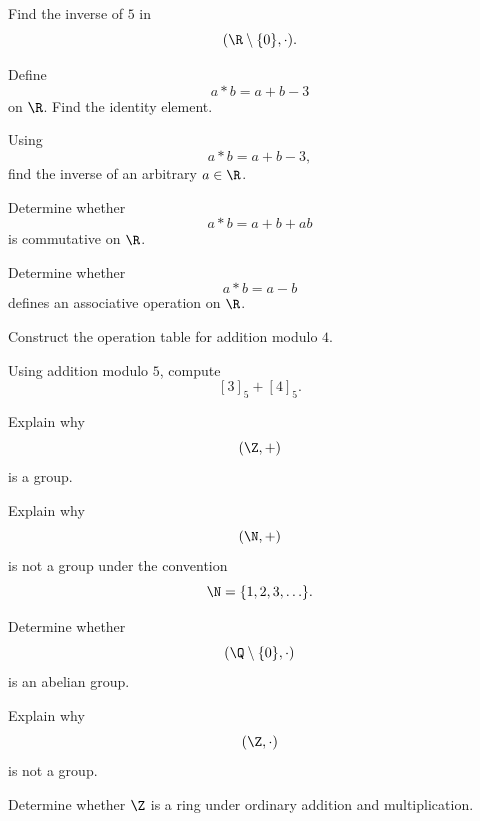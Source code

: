 \begin{exercise}[1]
Find the inverse of \(5\) in
\[ (\R\setminus\{0\},\cdot). \]
\end{exercise}

\begin{exercise}[2]
Define
\[ a*b=a+b-3 \]
on \(\R\). Find the identity element.
\end{exercise}

\begin{exercise}[2]
Using
\[ a*b=a+b-3, \]
find the inverse of an arbitrary \(a\in\R\).
\end{exercise}

\begin{exercise}[2]
Determine whether
\[ a*b=a+b+ab \]
is commutative on \(\R\).
\end{exercise}

\begin{exercise}[2]
Determine whether
\[ a*b=a-b \]
defines an associative operation on \(\R\).
\end{exercise}

\begin{exercise}[2]
Construct the operation table for addition modulo \(4\).
\end{exercise}

\begin{exercise}[2]
Using addition modulo \(5\), compute
\[ [3]_5+[4]_5. \]
\end{exercise}

\begin{exercise}[1]
Explain why
\[ (\Z,+) \]
is a group.
\end{exercise}

\begin{exercise}[1]
Explain why
\[ (\N,+) \]
is not a group under the convention
\[ \N=\{1,2,3,\ldots\}. \]
\end{exercise}

\begin{exercise}[2]
Determine whether
\[ (\Q\setminus\{0\},\cdot) \]
is an abelian group.
\end{exercise}

\begin{exercise}[2]
Explain why
\[ (\Z,\cdot) \]
is not a group.
\end{exercise}

\begin{exercise}[1]
Determine whether \(\Z\) is a ring under ordinary addition and multiplication.
\end{exercise}

